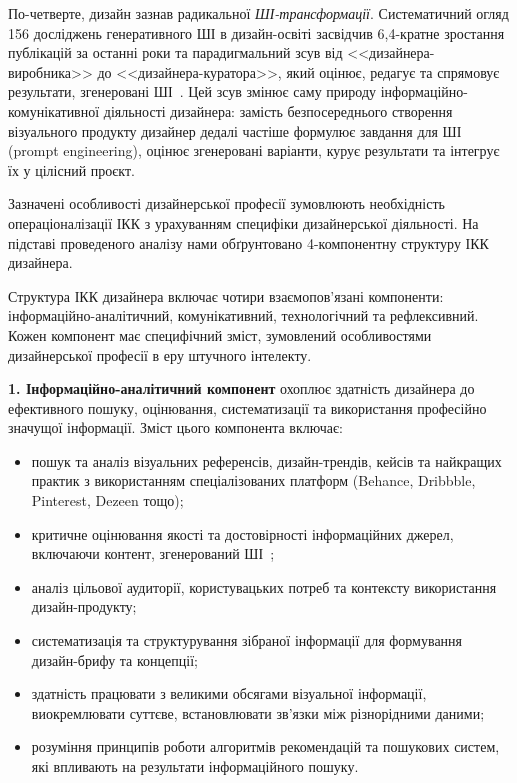 По-четверте, дизайн зазнав радикальної \textit{ШІ-трансформації}. Систематичний огляд 156 досліджень генеративного ШІ в дизайн-освіті засвідчив 6,4-кратне зростання публікацій за останні роки та парадигмальний зсув від <<дизайнера-виробника>> до <<дизайнера-куратора>>, який оцінює, редагує та спрямовує результати, згенеровані ШІ~\cite{Musiienko2026ScopingReview}. Цей зсув змінює саму природу інформаційно-комунікативної діяльності дизайнера: замість безпосереднього створення візуального продукту дизайнер дедалі частіше формулює завдання для ШІ (prompt engineering), оцінює згенеровані варіанти, курує результати та інтегрує їх у цілісний проєкт.

Зазначені особливості дизайнерської професії зумовлюють необхідність операціоналізації ІКК з урахуванням специфіки дизайнерської діяльності. На підставі проведеного аналізу нами обґрунтовано 4-компонентну структуру ІКК дизайнера.


Структура ІКК дизайнера включає чотири взаємопов'язані компоненти: інформаційно-аналітичний, комунікативний, технологічний та рефлексивний. Кожен компонент має специфічний зміст, зумовлений особливостями дизайнерської професії в еру штучного інтелекту.

\textbf{1. Інформаційно-аналітичний компонент} охоплює здатність дизайнера до ефективного пошуку, оцінювання, систематизації та використання професійно значущої інформації. Зміст цього компонента включає:

\begin{itemize}
    \item пошук та аналіз візуальних референсів, дизайн-трендів, кейсів та найкращих практик з використанням спеціалізованих платформ (Behance, Dribbble, Pinterest, Dezeen тощо);
    \item критичне оцінювання якості та достовірності інформаційних джерел, включаючи контент, згенерований ШІ~\cite{Musiienko2026ScopingReview};
    \item аналіз цільової аудиторії, користувацьких потреб та контексту використання дизайн-продукту;
    \item систематизація та структурування зібраної інформації для формування дизайн-брифу та концепції;
    \item здатність працювати з великими обсягами візуальної інформації, виокремлювати суттєве, встановлювати зв'язки між різнорідними даними;
    \item розуміння принципів роботи алгоритмів рекомендацій та пошукових систем, які впливають на результати інформаційного пошуку.
\end{itemize}

